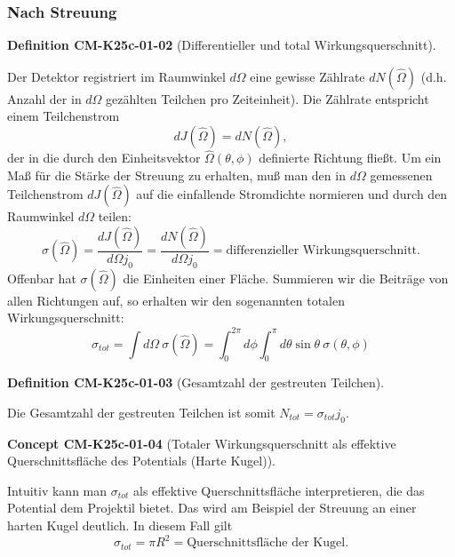 \documentclass[10pt, letterpaper]{article}
\newcommand{\CustomHeading}[3]{%
  \par\medskip\noindent%
  \textbf{#1 #2} \textnormal{(#3)}.\enskip%
}
\newenvironment{DEF}[2]{\begin{unitbox}\CustomHeading{Definition}{#1}{#2}}{\end{unitbox}}
\newenvironment{CONC}[2]{\begin{unitbox}\CustomHeading{Concept}{#1}{#2}}{\end{unitbox}}
\begin{document}
\subsubsection{Nach Streuung}

\begin{DEF}{CM-K25c-01-02}{Differentieller und total Wirkungsquerschnitt}
Der Detektor registriert im Raumwinkel $d\Omega$ eine gewisse Zählrate $dN(\hat{\Omega})$ (d.h. Anzahl der in $d\Omega$ gezählten Teilchen pro Zeiteinheit). Die Zählrate entspricht einem Teilchenstrom
\[
dJ(\hat{\Omega}) = dN(\hat{\Omega}),
\]
der in die durch den Einheitsvektor $\hat{\Omega}(\theta,\phi)$ definierte Richtung fließt. Um ein Maß für die Stärke der Streuung zu erhalten, muß man den in $d\Omega$ gemessenen Teilchenstrom $dJ(\hat{\Omega})$ auf die einfallende Stromdichte normieren und durch den Raumwinkel $d\Omega$ teilen:
\[
\sigma(\hat{\Omega}) = \frac{dJ(\hat{\Omega})}{d\Omega j_0} = \frac{dN(\hat{\Omega})}{d\Omega j_0} = \text{differenzieller Wirkungsquerschnitt.}
\]
Offenbar hat $\sigma(\hat{\Omega})$ die Einheiten einer Fläche. Summieren wir die Beiträge von allen Richtungen auf, so erhalten wir den sogenannten totalen Wirkungsquerschnitt:
\[
\sigma_{tot} = \int d\Omega\: \sigma(\hat{\Omega}) = \int_0^{2\pi} d\phi \int_0^{\pi} d\theta\sin\theta\: \sigma(\theta,\phi)
\]
\end{DEF}


\begin{DEF}{CM-K25c-01-03}{Gesamtzahl der gestreuten Teilchen}
Die Gesamtzahl der gestreuten Teilchen ist somit $N_{tot} = \sigma_{tot} j_0$.
\end{DEF}

\begin{CONC}{CM-K25c-01-04}{Totaler Wirkungsquerschnitt als effektive Querschnittsfläche des Potentials (Harte Kugel)}
Intuitiv kann man $\sigma_{tot}$ als effektive Querschnittsfläche interpretieren, die das Potential dem Projektil bietet. Das wird am Beispiel der Streuung an einer harten Kugel deutlich. In diesem Fall gilt
\[
\sigma_{tot} = \pi R^2 = \text{Querschnittsfläche der Kugel.}
\]
\end{CONC}

\begin{center}
\end{center}
\end{document}
